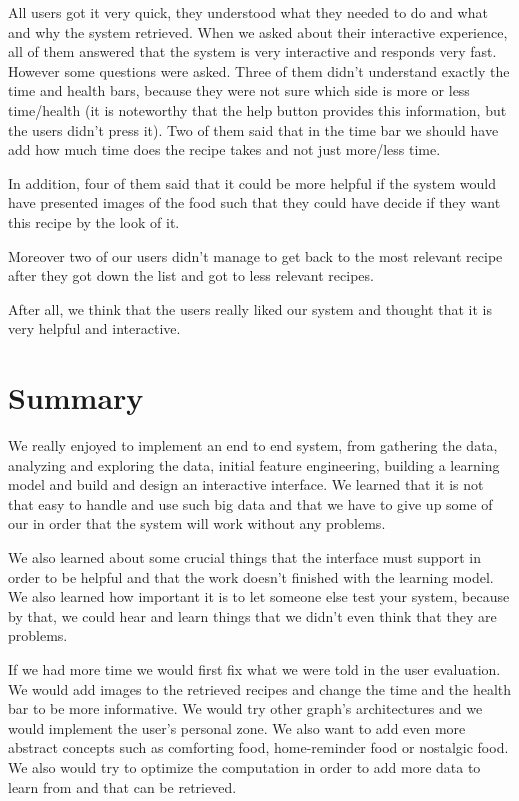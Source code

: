 \documentclass[]{article}
\begin{document}
All users got it very quick, they understood what they needed to do and what and why the system retrieved. When we asked about their interactive experience, all of them answered that the system is very interactive and responds very fast. However some questions were asked. Three of them didn't understand exactly the time and health bars, because they were not sure which side is more or less time/health (it is noteworthy that the help button provides this information, but the users didn't press it). Two of them said that in the time bar we should have add how much time does the recipe takes and not just more/less time.

In addition, four of them said that it could be more helpful if the system would have presented images of the food such that they could have decide if they want this recipe by the look of it.

Moreover two of our users didn't manage to get back to the most relevant recipe after they got down the list and got to less relevant recipes.

After all, we think that the users really liked our system and thought that it is very helpful and interactive.

\section{Summary}
We really enjoyed to implement an end to end system, from gathering the data, analyzing and exploring the data, initial feature engineering, building a learning model and build and design an interactive interface. We learned that it is not that easy to handle and use such big data and that we have to give up some of our in order that the system will work without any problems.

We also learned about some crucial things that the interface must support in order to be helpful and that the work doesn't finished with the learning model. We also learned how important it is to let someone else test your system, because by that, we could hear and learn things that we didn't even think that they are problems.

If we had more time we would first fix what we were told in the user evaluation. We would add images to the retrieved recipes and change the time and the health bar to be more informative. We would try other graph's architectures and we would implement the user's personal zone. We also want to add even more abstract concepts such as comforting food, home-reminder food or nostalgic food. We also would try to optimize the computation in order to add more data to learn from and that can be retrieved.
\end{document}
